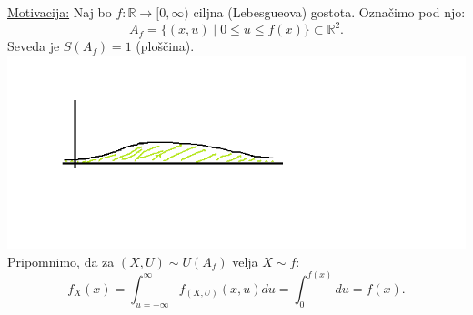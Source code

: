 \documentclass[a4paper, 12pt]{book}
\theoremstyle{definition}
\theoremstyle{remark}
\newcommand{\R}{\mathbb{R}}
\begin{document}
\underline{Motivacija:} Naj bo $f: \R \to [0, \infty)$ ciljna (Lebesgueova) gostota.
Označimo  pod njo:
\begin{equation*}
  A_f = \{(x, u) \mid 0 \leq u \leq f(x)\} \subset \R^2.
\end{equation*}
Seveda je $S(A_f) = 1$ (ploščina). \\
\includegraphics[scale=0.4]{območje_3_3} \\
Pripomnimo, da za $(X,U) \sim U(A_f)$ velja $X \sim f$:
\begin{equation*}
  f_X(x) = \int_{u=-\infty}^{\infty} f_{(X,U)}(x,u) du = \int_{0}^{f(x)} du = f(x).
\end{equation*}
\end{document}
